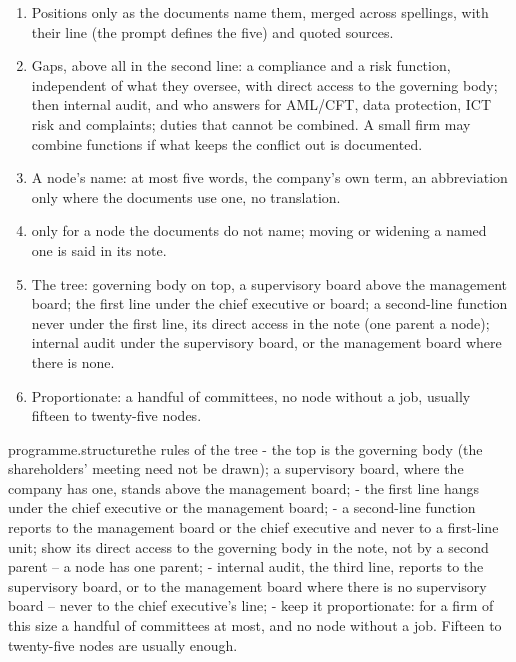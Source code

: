 \begin{enumerate}[itemsep=1pt, topsep=3pt]
  \item Positions only as the documents name them, merged across spellings, with their line
    (the prompt defines the five) and quoted sources.
  \item Gaps, above all in the second line: a compliance and a risk function, independent of
    what they oversee, with direct access to the governing body; then internal audit, and who
    answers for AML/CFT, data protection, ICT risk and complaints; duties that cannot be
    combined. A small firm may combine functions if what keeps the conflict out is documented.
  \item A node's name: at most five words, the company's own term, an abbreviation only where
    the documents use one, no translation.
  \item {} only for a node the documents do not name; moving or widening a named
    one is said in its note.
  \item The tree: governing body on top, a supervisory board above the management board; the
    first line under the chief executive or board; a second-line function never under the first
    line, its direct access in the note (one parent a node); internal audit under the
    supervisory board, or the management board where there is none.
  \item Proportionate: a handful of committees, no node without a job, usually fifteen to
    twenty-five nodes.
\end{enumerate}

\par\nopagebreak
\begin{promptexcerpt}{programme.structure}{the rules of the tree}
   - the top is the governing body (the shareholders' meeting need not be drawn); a supervisory board, where the company has one, stands above the management board;
   - the first line hangs under the chief executive or the management board;
   - a second-line function reports to the management board or the chief executive and never to a first-line unit; show its direct access to the governing body in the note, not by a second parent – a node has one parent;
   - internal audit, the third line, reports to the supervisory board, or to the management board where there is no supervisory board – never to the chief executive's line;
   - keep it proportionate: for a firm of this size a handful of committees at most, and no node without a job. Fifteen to twenty-five nodes are usually enough.
\end{promptexcerpt}

